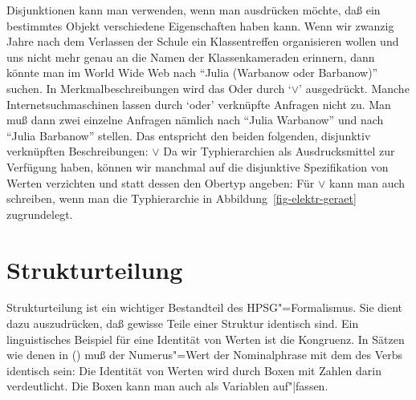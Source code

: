 Disjunktionen kann man verwenden, wenn man ausdrücken möchte, daß ein bestimmtes Objekt
verschiedene Eigenschaften haben kann. Wenn wir \zb zwanzig Jahre nach dem Verlassen der Schule
ein Klassentreffen organisieren wollen und uns nicht mehr genau an die Namen der Klassenkameraden erinnern,
dann könnte man im World Wide Web nach "`Julia (Warbanow oder Barbanow)"' suchen.
In Merkmalbeschreibungen wird das Oder durch `$\vee$'\is{$\vee$} ausgedrückt.
\ea
{}
\z
Manche Internetsuchmaschinen lassen durch `oder' verknüpfte Anfragen nicht zu. Man muß
dann zwei einzelne Anfragen nämlich nach "`Julia Warbanow"' und nach "`Julia Barbanow"'
stellen. Das entspricht den beiden folgenden, disjunktiv verknüpften Beschreibungen:
\ea
{} $\vee $
\z
Da wir Typhierarchien als Ausdrucksmittel zur Verfügung haben, können wir manchmal auf die
disjunktive Spezifikation von Werten verzichten und statt dessen den Obertyp angeben:
Für  $\vee$  kann man auch  schreiben,
wenn man die Typhierarchie in Abbildung~\vref{fig-elektr-geraet} zugrundelegt.%

\section{Strukturteilung}
\label{sec-strukturteilung}

Strukturteilung ist ein wichtiger Bestandteil des HPSG"=Formalismus. Sie dient
dazu auszudrücken, daß gewisse Teile einer Struktur identisch sind. Ein linguistisches
Beispiel für eine Identität von Werten ist die Kongruenz. In Sätzen wie denen in ()
muß der Numerus"=Wert der Nominalphrase mit dem des Verbs identisch sein:
\eal
{}
\zl
Die Identität von Werten wird durch Boxen mit Zahlen darin verdeutlicht.
Die Boxen kann man auch als Variablen auf"|fassen.

